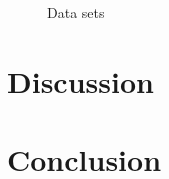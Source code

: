 \documentclass[11pt,a4paper]{article}
\begin{document}
\begin{figure}[H]
    \caption{Data sets}
    \label{fig:scale1}
  \end{figure}

\section{\label{sect:discuss}Discussion}
\section{\label{sect:conclusion}Conclusion}





%
%
\end{document}
